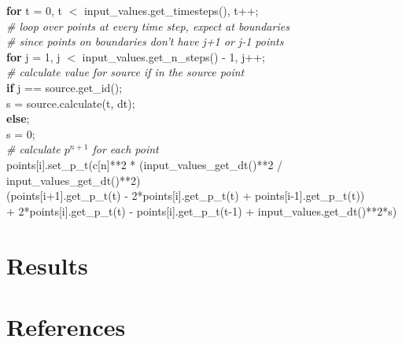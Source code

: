 \documentclass[]{article}
\begin{document}
\textbf{for} t = 0, t $<$ input\_values.get\_timesteps(), t++; \\
\indent \textit{\# loop over points at every time step, expect at boundaries} \\
\indent \textit{\# since points on boundaries don't have j+1 or j-1 points} \\
\indent \textbf{for} j = 1, j $<$ input\_values.get\_n\_steps() - 1, j++; \\
\indent \indent \textit{\# calculate value for source if in the source point} \\
\indent \indent \textbf{if} j == source.get\_id(); \\
\indent \indent \indent s = source.calculate(t, dt); \\
\indent \indent \textbf{else}; \\
\indent \indent \indent s = 0; \\
\indent \indent \textit{\# calculate $p^{n+1}$ for each point} \\
\indent \indent points[i].set\_p\_t(c[n]**2 * (input\_values\_get\_dt()**2 / input\_values\_get\_dt()**2) \\
\indent \indent *(points[i+1].get\_p\_t(t) - 2*points[i].get\_p\_t(t) + points[i-1].get\_p\_t(t)) \\
\indent \indent + 2*points[i].get\_p\_t(t) - points[i].get\_p\_t(t-1) + input\_values.get\_dt()**2*s)


\newpage

\section{Results}

\newpage

\section{References}

\newpage
\end{document}

